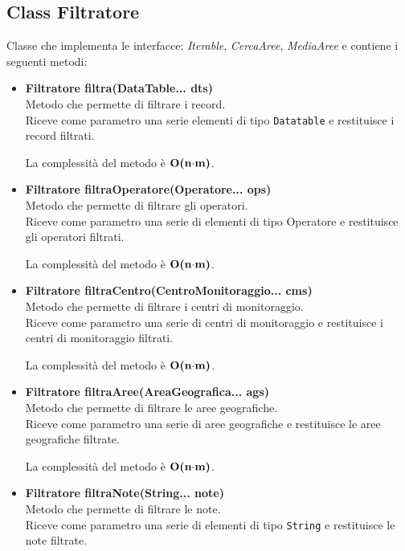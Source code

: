 \documentclass[a4paper, 12pt]{scrreprt}
\begin{document}
			\subsection{Class Filtratore}
			Classe che implementa le interfacce: \textsl{Iterable}, \textsl{CercaAree}, \textsl{MediaAree} e contiene i seguenti metodi:
			\begin{itemize}
				\item \textbf{Filtratore filtra(DataTable... dts)}
				\\Metodo che permette di filtrare i record.
				\\Riceve come parametro una serie elementi di tipo \verb!Datatable! e restituisce i record filtrati.
				
				La complessit\`a del metodo \`e $\mathbf{O}\textbf{(n$\cdot$m)}$.
				
				\item \textbf{Filtratore filtraOperatore(Operatore... ops)}
				\\Metodo che permette di filtrare gli operatori.
				\\Riceve come parametro una serie di elementi di tipo Operatore e restituisce gli operatori filtrati.
				
				La complessit\`a del metodo \`e $\mathbf{O}\textbf{(n$\cdot$m)}$.
				
				\pagebreak
				\item \textbf{Filtratore filtraCentro(CentroMonitoraggio... cms)}
				\\Metodo che permette di filtrare i centri di monitoraggio.
				\\Riceve come parametro una serie di centri di monitoraggio e restituisce i centri di monitoraggio filtrati.
				
				La complessit\`a del metodo \`e $\mathbf{O}\textbf{(n$\cdot$m)}$.
				
				\item \textbf{Filtratore filtraAree(AreaGeografica... ags)}
				\\Metodo che permette di filtrare le aree geografiche.
				\\Riceve come parametro una serie di aree geografiche e restituisce le aree geografiche filtrate.
				
				La complessit\`a del metodo \`e $\mathbf{O}\textbf{(n$\cdot$m)}$.
				
				\item \textbf{Filtratore filtraNote(String... note)}
				\\Metodo che permette di filtrare le note.
				\\Riceve come parametro una serie di elementi di tipo \verb!String! e restituisce le note filtrate.
				

\end{itemize}
\end{document}
